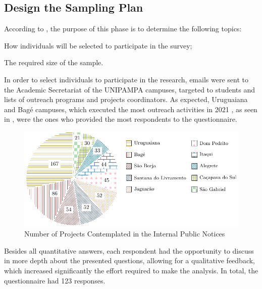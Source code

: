 \subsection{Design the Sampling Plan}\label{sec:survey-sampling}

According to \textcite{kasunic2005designing}, the purpose of this phase is to determine the following topics:
\begin{inparaenum}[(i)]
  \item How individuals will be selected to participate in the survey;
  \item The required size of the sample.
\end{inparaenum}

In order to select individuals to participate in the research, emails were sent to the Academic Secretariat of the \ac{UNIPAMPA} campuses, targeted to students and lists of outreach programs and projects coordinators. As expected, Uruguaiana and Bagé campuses, which executed the most outreach activities in 2021 \cite{relatorio-2021}, as seen in , were the ones who provided the most respondents to the questionnaire.

\begin{figure}[!htb]
  \caption{Number of Projects Contemplated in the Internal Public Notices}\label{fig:number-of-projects}
  \begin{center}
    \includegraphics[width=16cm]{img/5-number-of-projects.pdf}
  \end{center}
\end{figure}

Besides all quantitative answers, each respondent had the opportunity to discuss in more depth about the presented questions, allowing for a qualitative feedback, which increased significantly the effort required to make the analysis. In total, the questionnaire had 123 responses.

